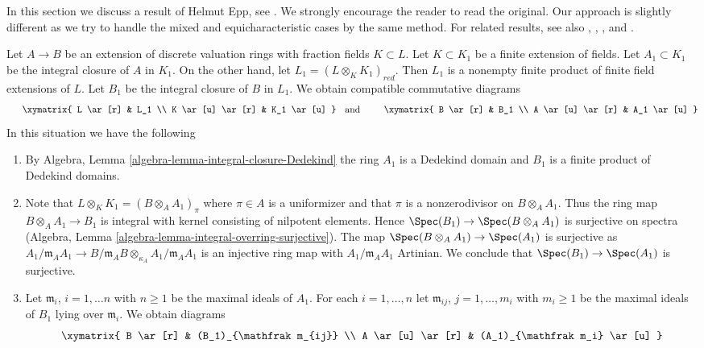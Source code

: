 \noindent
In this section we discuss a result of Helmut Epp, see \cite{Epp}. We strongly
encourage the reader to read the original. Our approach is slightly different
as we try to handle the mixed and equicharacteristic cases by the same method.
For related results, see also
\cite{Ponomarev}, \cite{Ponomarev-Abhyankar}, \cite{Kuhlmann}, and \cite{ZK}.

\begin{remark}
\label{remark-construction}
Let $A \to B$ be an extension of discrete valuation rings with fraction
fields $K \subset L$. Let $K \subset K_1$ be a finite extension of
fields. Let $A_1 \subset K_1$ be the integral closure of $A$ in $K_1$.
On the other hand, let $L_1 = (L \otimes_K K_1)_{red}$. Then $L_1$ is a
nonempty finite product of finite field extensions of $L$. Let $B_1$ be
the integral closure of $B$ in $L_1$. We obtain compatible commutative
diagrams
$$
\vcenter{
\xymatrix{
L \ar[r] & L_1 \\
K \ar[u] \ar[r] & K_1 \ar[u]
}
}
\quad\text{and}\quad
\vcenter{
\xymatrix{
B \ar[r] & B_1 \\
A \ar[u] \ar[r] & A_1 \ar[u]
}
}
$$
In this situation we have the following
\begin{enumerate}
\item By Algebra, Lemma \ref{algebra-lemma-integral-closure-Dedekind}
the ring $A_1$ is a Dedekind domain and $B_1$ is a finite product of
Dedekind domains.
\item Note that $L \otimes_K K_1 = (B \otimes_A A_1)_\pi$ where $\pi \in A$
is a uniformizer and that $\pi$ is a nonzerodivisor on $B \otimes_A A_1$. 
Thus the ring map $B \otimes_A A_1 \to B_1$ is integral with kernel
consisting of nilpotent elements. Hence $\Spec(B_1) \to \Spec(B \otimes_A A_1)$
is surjective on spectra
(Algebra, Lemma \ref{algebra-lemma-integral-overring-surjective}).
The map $\Spec(B \otimes_A A_1) \to \Spec(A_1)$ is surjective as
$A_1/\mathfrak m_A A_1 \to
B/\mathfrak m_AB \otimes_{\kappa_A} A_1/\mathfrak m_A A_1$
is an injective ring map with $A_1/\mathfrak m_A A_1$ Artinian.
We conclude that $\Spec(B_1) \to \Spec(A_1)$ is surjective.
\item Let $\mathfrak m_i$, $i = 1, \ldots n$ with $n \geq 1$ be the
maximal ideals of $A_1$. For each $i = 1, \ldots, n$ let
$\mathfrak m_{ij}$, $j = 1, \ldots, m_i$ with $m_i \geq 1$
be the maximal ideals of $B_1$ lying over $\mathfrak m_i$. We obtain diagrams
$$
\xymatrix{
B \ar[r] & (B_1)_{\mathfrak m_{ij}} \\
A \ar[u] \ar[r] & (A_1)_{\mathfrak m_i} \ar[u]
}$$
\end{enumerate}
\end{remark}
